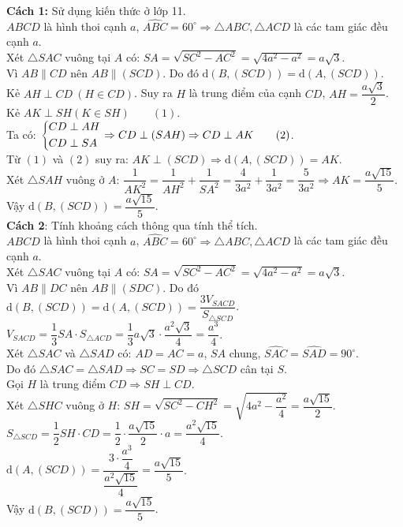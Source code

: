 \begin{ex}
{\begin{center}
\begin{tikzpicture}[=>stealth,line join=round,line cap=round,font=\footnotesize,scale=1]
			\end{tikzpicture}
		\end{center}
		\textbf{Cách 1:} Sử dụng kiến thức ở lớp 11.\\
		$ABCD$ là hình thoi cạnh $a$, $\widehat{ABC}=60^{\circ}\Rightarrow\triangle ABC,\triangle ACD$ là các tam giác đều cạnh $a$.\\
		Xét $\triangle SAC$ vuông tại $A$ có: $SA=\sqrt{SC^2-AC^2} =\sqrt{4a^2-a^2} =a\sqrt{3}$.\\
		Vì $AB\parallel CD$ nên $AB\parallel (SCD)$. Do đó $\mathrm{d}\left(B,(SCD)\right)=\mathrm{d}\left(A,(SCD)\right)$.\\
		Kẻ $AH\perp CD ~ (H\in CD)$. Suy ra $H$ là trung điểm của cạnh $CD$, $AH=\dfrac{a\sqrt{3}}{2}$.\\
		Kẻ $AK\perp SH (K\in SH) \qquad (1)$.\\
		Ta có: $\heva{&CD\perp AH\\&CD\perp SA}\Rightarrow CD\perp(SAH)\Rightarrow CD\perp AK \qquad (2)$.\\
		Từ $(1)$ và $(2)$ suy ra: $AK\perp(SCD)\Rightarrow\mathrm{d}\left(A,(SCD)\right)=AK$.\\
		Xét $\triangle SAH$ vuông ở $A$: $\dfrac{1}{AK^2}=\dfrac{1}{AH^2}+\dfrac{1}{SA^2} =\dfrac{4}{3a^2}+\dfrac{1}{3a^2} =\dfrac{5}{3a^2}\Rightarrow AK=\dfrac{a\sqrt{15}}{5}$.\\
		Vậy $\mathrm{d}\left(B,(SCD)\right)=\dfrac{a\sqrt{15}}{5}$.\\
		\textbf{	Cách 2}: Tính khoảng cách thông qua tính thể tích.\\
		$ABCD$ là hình thoi cạnh $a$, $\widehat{ABC}=60^{\circ}\Rightarrow\triangle ABC,\triangle ACD$ là các tam giác đều cạnh $a$.\\
		Xét $\triangle SAC$ vuông tại $A$ có: $SA=\sqrt{SC^2-AC^2} =\sqrt{4a^2-a^2} =a\sqrt{3}$.\\
		Vì $AB\parallel DC$ nên $AB\parallel (SDC)$. Do đó $\mathrm{d}\left(B,(SCD)\right)=\mathrm{d}\left(A,(SCD)\right)=\dfrac{3V_{SACD}}{S_{\triangle SCD}}$.\\
		$V_{SACD}=\dfrac{1}{3}SA\cdot S_{\triangle ACD} =\dfrac{1}{3}a\sqrt{3}\cdot\dfrac{a^2\sqrt{3}}{4} =\dfrac{a^3}{4}$.\\
		Xét $\triangle SAC$ và $\triangle SAD$ có: $AD=AC=a$, $SA$ chung, $\widehat{SAC}=\widehat{SAD}=90^{\circ}$.\\
		Do đó $\triangle SAC=\triangle SAD\Rightarrow SC=SD\Rightarrow\triangle SCD$ cân tại $S$.\\
		Gọi $H$ là trung điểm $CD\Rightarrow SH\perp CD$.\\
		Xét $\triangle SHC$ vuông ở $H$: $SH=\sqrt{SC^2-CH^2} =\sqrt{4a^2-\dfrac{a^2}{4}} =\dfrac{a\sqrt{15}}{2}$.\\
		$S_{\triangle SCD}=\dfrac{1}{2}SH\cdot CD =\dfrac{1}{2}\cdot\dfrac{a\sqrt{15}}{2}\cdot a =\dfrac{a^2\sqrt{15}}{4}$.\\
		$\mathrm{d}\left(A,(SCD)\right) =\dfrac{3\cdot\dfrac{a^3}{4}}{\dfrac{a^2\sqrt{15}}{4}} =\dfrac{a\sqrt{15}}{5}$.\\
		Vậy $\mathrm{d}\left(B,(SCD)\right)=\dfrac{a\sqrt{15}}{5}$.}
\end{ex}
